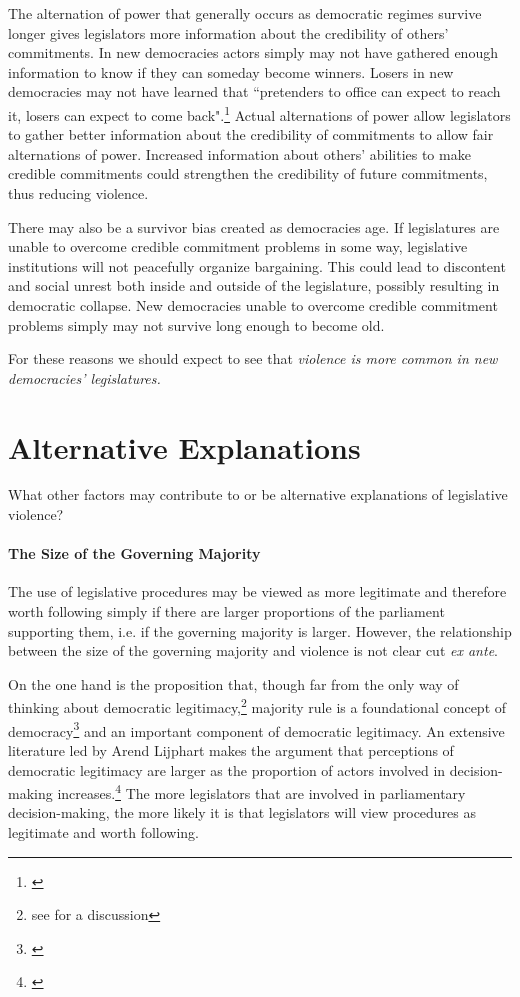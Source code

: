 \documentclass[a4paper]{article}\usepackage[]{graphicx}\usepackage[]{color}
\begin{document}
The alternation of power that generally occurs as democratic regimes survive longer gives legislators more information about the credibility of others' commitments. In new democracies actors simply may not have gathered enough information to know if they can someday become winners. Losers in new democracies may not have learned that ``pretenders to office can expect to reach it, losers can expect to come back".\footnote{\citealt[][36]{Przeworski1991}} Actual alternations of power allow legislators to gather better information about the credibility of commitments to allow fair alternations of power. Increased information about others' abilities to make credible commitments could strengthen the credibility of future commitments, thus reducing violence.

There may also be a survivor bias created as democracies age. If legislatures are unable to overcome credible commitment problems in some way, legislative institutions will not peacefully organize bargaining. This could lead to discontent and social unrest both inside and outside of the legislature, possibly resulting in democratic collapse. New democracies unable to overcome credible commitment problems simply may not survive long enough to become old.

For these reasons we should expect to see that \emph{violence is more common in new democracies' legislatures.}

\section{Alternative Explanations}

What other factors may contribute to or be alternative explanations of legislative violence?

\paragraph{The Size of the Governing Majority}

The use of legislative procedures may be viewed as more legitimate and therefore worth following simply if there are larger proportions of the parliament supporting them, i.e. if the governing majority is larger. However, the relationship between the size of the governing majority and violence is not clear cut \emph{ex ante}. 

On the one hand is the proposition that, though far from the only way of thinking about democratic legitimacy,\footnote{see \citealt{Follesdal2006} for a discussion} majority rule is a foundational concept of democracy\footnote{\citealt{Dahl1989}} and an important component of democratic legitimacy. An extensive literature led by Arend Lijphart makes the argument that perceptions of democratic legitimacy are larger as the proportion of actors involved in decision-making increases.\footnote{\citealt{Lijphart2007}} The more legislators that are involved in parliamentary decision-making, the more likely it is that legislators will view procedures as legitimate and worth following. 
\end{document}
